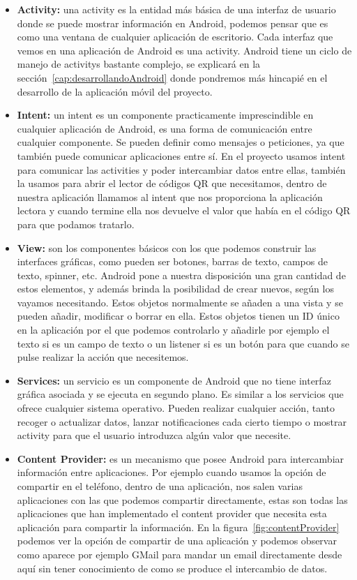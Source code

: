 \begin{itemize}

\item \textbf{Activity:} una activity es la entidad más básica de una interfaz de usuario donde se puede mostrar información en Android, podemos pensar que es como una ventana de cualquier aplicación de escritorio. Cada interfaz que vemos en una aplicación de Android es una activity. Android tiene un ciclo de manejo de activitys bastante complejo, se explicará en la sección~\ref{cap:desarrollandoAndroid} donde pondremos más hincapié en el desarrollo de la aplicación móvil del proyecto.

\item \textbf{Intent:} un intent es un componente practicamente imprescindible en cualquier aplicación de Android, es una forma de comunicación entre cualquier componente. Se pueden definir como mensajes o peticiones, ya que también puede comunicar aplicaciones entre sí. En el proyecto usamos intent para comunicar las activities y poder intercambiar datos entre ellas, también la usamos para abrir el lector de códigos QR que necesitamos, dentro de nuestra aplicación llamamos al intent que nos proporciona la aplicación lectora y cuando termine ella nos devuelve el valor que había en el código QR para que podamos tratarlo.

\item \textbf{View:} son los componentes básicos con los que podemos construir las interfaces gráficas, como pueden ser botones, barras de texto, campos de texto, spinner, etc. Android pone a nuestra disposición una gran cantidad de estos elementos, y además brinda la posibilidad de crear nuevos, según los vayamos necesitando. Estos objetos normalmente se añaden a una vista y se pueden añadir, modificar o borrar en ella. Estos objetos tienen un ID único en la aplicación por el que podemos controlarlo y añadirle por ejemplo el texto si es un campo de texto o un listener si es un botón para que cuando se pulse realizar la acción que necesitemos.

\item \textbf{Services:} un servicio es un componente de Android que no tiene interfaz gráfica asociada y se ejecuta en segundo plano. Es similar a los servicios que ofrece cualquier sistema operativo. Pueden realizar cualquier acción, tanto recoger o actualizar datos, lanzar notificaciones cada cierto tiempo o mostrar activity para que el usuario introduzca algún valor que necesite.

\item \textbf{Content Provider:} es un mecanismo que posee Android para intercambiar información entre aplicaciones. Por ejemplo cuando usamos la opción de compartir en el teléfono, dentro de una aplicación, nos salen varias aplicaciones con las que podemos compartir directamente, estas son todas las aplicaciones que han implementado el content provider que necesita esta aplicación para compartir la información. En la figura~\ref{fig:contentProvider} podemos ver la opción de compartir de una aplicación y podemos observar como aparece por ejemplo GMail para mandar un email directamente desde aquí sin tener conocimiento de como se produce el intercambio de datos.
 

\end{itemize}
